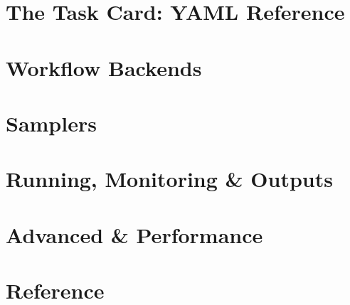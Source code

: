 \documentclass[symmetric,openany,nobib]{tufte-book}
\let\jorigpart\part
\renewcommand{\part}{\cleardoublepage\jorigpart}
\begin{document}
\part{The Task Card: YAML Reference}\label{part:task-card}







\part{Workflow Backends}\label{part:backends}






\part{Samplers}\label{part:samplers}












\part{Running, Monitoring \& Outputs}\label{part:running}







\part{Advanced \& Performance}\label{part:advanced}






\appendix
\part{Reference}




\backmatter

\printbibliography[heading=bibintoc, title={Bibliography}]

\end{document}
